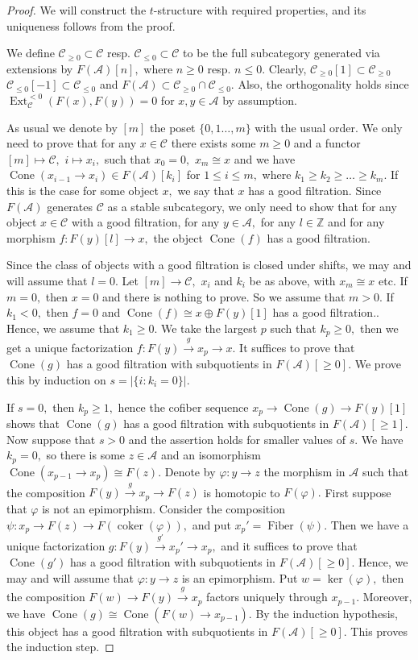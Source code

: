 \documentclass[11pt,leqno]{amsart}
\numberwithin{equation}{section}
\def\Z{\mathbb{Z}}
\newcommand{\xto}{\xrightarrow}
\newcommand{\Cone}{\operatorname{Cone}}
\newcommand{\Fiber}{\operatorname{Fiber}}
\newcommand{\cA}{{\mathcal A}}
\newcommand{\cC}{{\mathcal C}}
\newcommand{\coker}{\operatorname{coker}}
\newcommand{\Ext}{\operatorname{Ext}}
\begin{document}
\begin{proof}
We will construct the $t$-structure with required properties, and its uniqueness follows from the proof.
	
We define $\cC_{\geq 0}\subset\cC$ resp. $\cC_{\leq 0}\subset\cC$ to be the full subcategory generated via extensions by $F(\cA)[n],$ where $n\geq 0$ resp. $n\leq 0.$ Clearly, $\cC_{\geq 0}[1]\subset\cC_{\geq 0}$ $\cC_{\leq 0}[-1]\subset\cC_{\leq 0}$ and $F(\cA)\subset\cC_{\geq 0}\cap \cC_{\leq 0}.$ Also, the orthogonality holds since $\Ext_{\cC}^{<0}(F(x),F(y))=0$ for $x,y\in\cA$ by assumption. 

As usual we denote by $[m]$ the poset $\{0,1\dots,m\}$ with the usual order. We only need to prove that for any $x\in\cC$ there exists some $m\geq 0$ and a functor $[m]\mapsto \cC,$ $i\mapsto x_i,$ such that $x_0=0,$ $x_m\cong x$ and we have $\Cone(x_{i-1}\to x_i)\in F(\cA)[k_i]$ for $1\leq i\leq m,$ where $k_1\geq k_2\geq\dots\geq k_m.$ If this is the case for some object $x,$ we say that $x$ has a good filtration. Since $F(\cA)$ generates $\cC$ as a stable subcategory, we only need to show that for any object $x\in \cC$ with a good filtration, for any $y\in\cA,$ for any $l\in\Z$ and for any morphism $f:F(y)[l]\to x,$ the object $\Cone(f)$ has a good filtration.

Since the class of objects with a good filtration is closed under shifts, we may and will assume that $l=0.$ Let $[m]\to\cC,$ $x_i$ and $k_i$ be as above, with $x_m\cong x$ etc. If $m=0,$ then $x=0$ and there is nothing to prove. So we assume that $m>0.$ If $k_1<0,$ then $f=0$ and $\Cone(f)\cong x\oplus F(y)[1]$ has a good filtration.. Hence, we assume that $k_1\geq 0.$ We take the largest $p$ such that $k_p\geq 0,$ then we get a unique factorization $f:F(y)\xto{g}x_p\to x.$ It suffices to prove that $\Cone(g)$ has a good filtration with subquotients in $F(\cA)[\geq 0].$ We prove this by induction on $s=|\{i: k_i=0\}|.$

If $s=0,$ then $k_p\geq 1,$ hence the cofiber sequence $x_p\to \Cone(g)\to F(y)[1]$ shows that $\Cone(g)$ has a good filtration with subquotients in $F(\cA)[\geq 1].$ Now suppose that $s>0$ and the assertion holds for smaller values of $s.$ We have $k_p=0,$ so there is some $z\in \cA$ and an isomorphism $\Cone(x_{p-1}\to x_p)\cong F(z).$ Denote by $\varphi:y\to z$ the morphism in $\cA$ such that the composition $F(y)\xto{g}x_p\to F(z)$ is homotopic to $F(\varphi).$ First suppose that $\varphi$ is not an epimorphism. Consider the composition $\psi:x_p\to F(z)\to F(\coker(\varphi)),$ and put $x_p'=\Fiber(\psi).$ Then we have a unique factorization $g:F(y)\xto{g'} x_p'\to x_p,$ and it suffices to prove that $\Cone(g')$ has a good filtration with subquotients in $F(\cA)[\geq 0].$ Hence, we may and will assume that $\varphi:y\to z$ is an epimorphism. Put $w=\ker(\varphi),$ then the composition $F(w)\to F(y)\xto{g} x_p$ factors uniquely through $x_{p-1}.$ Moreover, we have $\Cone(g)\cong \Cone(F(w)\to x_{p-1}).$ By the induction hypothesis, this object has a good filtration with subquotients in $F(\cA)[\geq 0].$ This proves the induction step.   


\end{proof}
\end{document}
